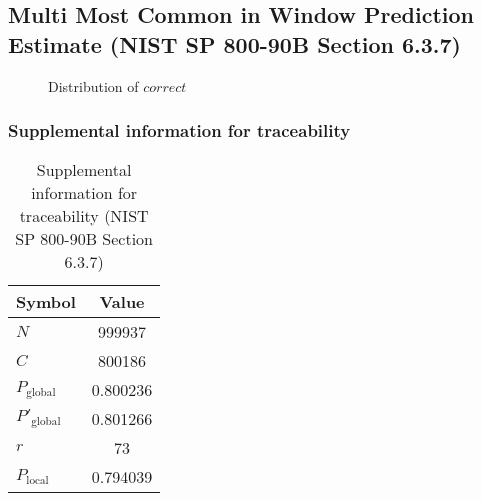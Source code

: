 \documentclass[a3paper,xelatex,english]{bxjsarticle}
\begin{document}
\subsection{Multi Most Common in Window Prediction Estimate (NIST SP 800-90B Section 6.3.7)}\label{sec:NonBinary637}

\begin{figure}[htbp]
\centering

\caption{Distribution of $correct$}
\end{figure}
\subsubsection{Supplemental information for traceability}
\renewcommand{\arraystretch}{1.8}
\begin{table}[h]
\caption{Supplemental information for traceability (NIST SP 800-90B Section 6.3.7)}
\begin{center}
\begin{tabular}{|l|c|}
\hline 
\rowcolor{anotherlightblue} %
Symbol				& Value \\ \hline 
$N$				& 999937\\ \hline 
$C$				& 800186\\ \hline 
$P_{\textrm{global}}$				& 0.800236\\ \hline 
$P'_{\textrm{global}}$			& 0.801266\\ \hline 
$r$				& 73\\ \hline 
$P_{\textrm{local}}$ 			& 0.794039\\ \hline
\end{tabular}
\end{center}
\end{table}
\renewcommand{\arraystretch}{1.4}
\clearpage
\end{document}
